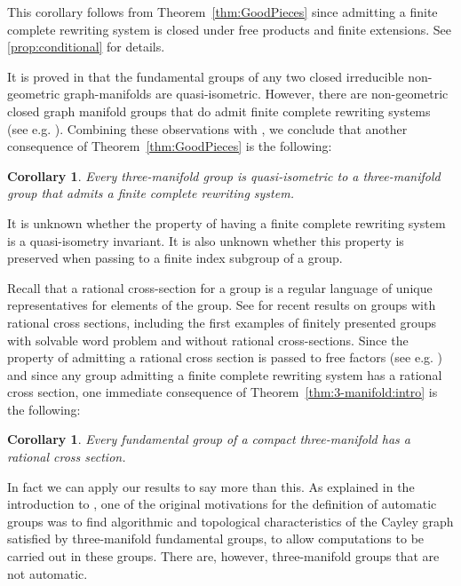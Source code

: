 \documentclass[12pt, a4paper]{amsart}
\newtheorem{corollary}[theorem]{Corollary}
\theoremstyle{definition}
\begin{document}
This corollary follows from Theorem~\ref{thm:GoodPieces} since admitting a finite complete rewriting system is closed under free products and finite extensions. See \cref{prop:conditional} for details.

It is proved in \cite{behrstock2008quasi} that the fundamental groups of any two closed irreducible non-geometric graph-manifolds are quasi-isometric. 
However, there are non-geometric closed graph manifold groups that do admit finite complete rewriting systems (see e.g. \cite[Section~6]{Hermiller1999}). 
Combining these observations with \cite[Theorem 0.1]{papasoglu2002quasi}, 
we conclude that another consequence of Theorem~\ref{thm:GoodPieces} is the following: 

\begin{corollary} 
Every three-manifold group is quasi-isometric to a three-manifold group
that admits a finite complete rewriting system.
\end{corollary}


It is unknown whether the property of having a finite complete rewriting system is a quasi-isometry invariant. It is also unknown whether this property is preserved when passing to a finite index subgroup of a group. 

Recall that a rational cross-section for a group is a regular language of unique representatives for elements of the group. 
See \cite{Bodart2024} for recent results on groups with rational cross sections, including the first examples of finitely presented groups with solvable word problem and without rational cross-sections.
Since the property of admitting a rational cross section is passed to free factors (see e.g. \cite[page 2]{Bodart2024}) and since any group admitting a finite complete rewriting system has a rational cross section, one immediate consequence of Theorem~\ref{thm:3-manifold:intro} is the following:  
  
\begin{corollary} \label{cor:3-manifold} 
Every fundamental group of a compact three-manifold 
has a rational cross section.  \end{corollary}

In fact we can apply our results to say more than this.    
As explained in the introduction to \cite{Hermiller2018}, one of the original motivations for the definition of automatic groups was to find algorithmic and topological characteristics of the Cayley graph satisfied by three-manifold fundamental groups, to allow computations to be carried out in these groups. There are, however, three-manifold groups that are not automatic.  
\end{document}
